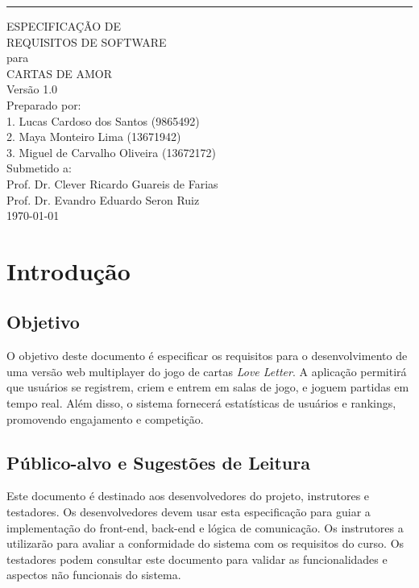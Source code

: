 \documentclass{scrreprt}
\date{}
\def\myversion{1.0 }
\begin{document}
\begin{flushright}
    \rule{16cm}{5pt}\vskip1cm
    \begin{bfseries}
        \Huge{ESPECIFICAÇÃO DE\\REQUISITOS DE SOFTWARE}\\
        \vspace{1.25cm}
        para\\
        \vspace{1.25cm}
        CARTAS DE AMOR\\
        \vspace{1.25cm}
        \LARGE{Versão \myversion}\\
        \vspace{1.25cm}
        Preparado por:\\
        1. Lucas Cardoso dos Santos (9865492)\\
        2. Maya Monteiro Lima (13671942)\\
        3. Miguel de Carvalho Oliveira  (13672172)\\
        \vspace{1.25cm}
        Submetido a:\\
        Prof. Dr. Clever Ricardo Guareis de Farias\\
        Prof. Dr. Evandro Eduardo Seron Ruiz\\
        \vspace{1.25cm}
        \today\\
    \end{bfseries}
\end{flushright}

\tableofcontents

\chapter{Introdução}

\section{Objetivo}
O objetivo deste documento é especificar os requisitos para o desenvolvimento de uma versão web multiplayer do jogo de cartas \textit{Love Letter}. A aplicação permitirá que usuários se registrem, criem e entrem em salas de jogo, e joguem partidas em tempo real. Além disso, o sistema fornecerá estatísticas de usuários e rankings, promovendo engajamento e competição.

\section{Público-alvo e Sugestões de Leitura}
Este documento é destinado aos desenvolvedores do projeto, instrutores e testadores. Os desenvolvedores devem usar esta especificação para guiar a implementação do front-end, back-end e lógica de comunicação. Os instrutores a utilizarão para avaliar a conformidade do sistema com os requisitos do curso. Os testadores podem consultar este documento para validar as funcionalidades e aspectos não funcionais do sistema.
\end{document}
